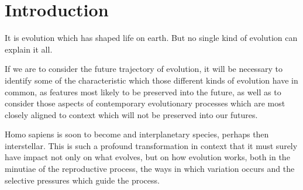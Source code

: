 \documentclass[10pt,titlepage]{article}
\begin{document}
\section{Introduction}

It is evolution which has shaped life on earth.
But no single kind of evolution can explain it all.

If we are to consider the future trajectory of evolution, it will be necessary to identify some of the characteristic which those different kinds of evolution have in common, as features most likely to be preserved into the future, as well as to consider those aspects of contemporary evolutionary processes which are most closely aligned to context which will not be preserved into our futures.

Homo sapiens is soon to become and interplanetary species, perhaps then interstellar.
This is such a profound transformation in context that it must surely have impact not only on what evolves, but on how evolution works, both in the minutiae of the reproductive process, the ways in which variation occurs and the selective pressures which guide the process.

{}




\label{index}
{\twocolumn[]
{\small\printindex}}





\end{document}

